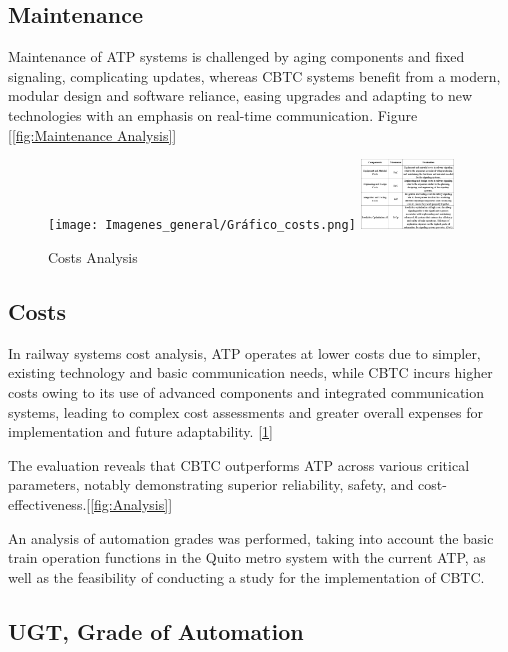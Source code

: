 \documentclass[conference]{IEEEtran}
\begin{document}
\subsection{Maintenance}
Maintenance of ATP systems is challenged by aging components and fixed signaling, complicating updates, whereas CBTC systems benefit from a modern, modular design and software reliance, easing upgrades and adapting to new technologies with an emphasis on real-time communication. Figure [\ref{fig:Maintenance Analysis}]\\
\begin{figure}[htbp]
    \centering
        \texttt{[image: Imagenes\_general/Gráfico\_costs.png]}
    \includegraphics[width=0.22\textwidth,scale=1]{Imagenes_general/tablas_costs.jpg}
    \caption{Costs Analysis}
    \label{fig:Costs Analysis}
\end{figure}
\subsection{Costs}
In railway systems cost analysis, ATP operates at lower costs due to simpler, existing technology and basic communication needs, while CBTC incurs higher costs owing to its use of advanced components and integrated communication systems, leading to complex cost assessments and greater overall expenses for implementation and future adaptability. [\ref{fig:Costs Analysis}]

The evaluation reveals that CBTC outperforms ATP across various critical parameters, notably demonstrating superior reliability, safety, and cost-effectiveness.[\ref{fig:Analysis}]

An analysis of automation grades was performed, taking into account the basic train operation functions in the Quito metro system with the current ATP, as well as the feasibility of conducting a study for the implementation of CBTC.

\subsection{UGT, Grade of  Automation }
\end{document}
